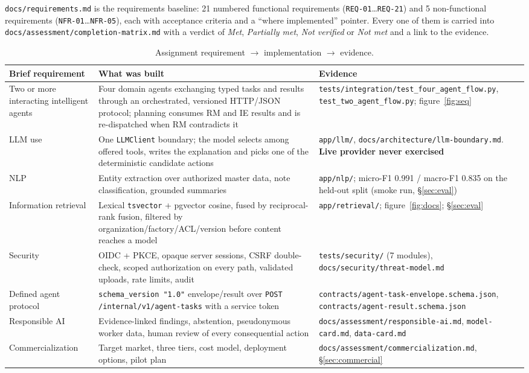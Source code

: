 \documentclass[11pt,a4paper]{article}
\begin{document}
\texttt{docs/requirements.md} is the requirements baseline: 21 numbered
functional requirements (\texttt{REQ-01}\dots\texttt{REQ-21}) and 5
non-functional requirements (\texttt{NFR-01}\dots\texttt{NFR-05}), each with
acceptance criteria and a ``where implemented'' pointer. Every one of them is
carried into \texttt{docs/assessment/completion-matrix.md} with a verdict of
\emph{Met}, \emph{Partially met}, \emph{Not verified} or \emph{Not met} and a
link to the evidence.

\begin{table}[h]
\centering\small
\caption{Assignment requirement $\rightarrow$ implementation $\rightarrow$ evidence.}
\begin{tabularx}{\linewidth}{@{}L{3.1cm}YL{3.6cm}@{}}
\toprule
\textbf{Brief requirement} & \textbf{What was built} & \textbf{Evidence}\\
\midrule
Two or more interacting intelligent agents &
Four domain agents exchanging typed tasks and results through an orchestrated,
versioned HTTP/JSON protocol; planning consumes RM and IE results and is
re-dispatched when RM contradicts it &
\texttt{tests/integration/test\_four\_agent\_flow.py}, \texttt{test\_two\_agent\_flow.py}; figure~\ref{fig:seq}\\
LLM use &
One \texttt{LLMClient} boundary; the model selects among offered tools, writes
the explanation and picks one of the deterministic candidate actions &
\texttt{app/llm/}, \texttt{docs/architecture/llm-boundary.md}. \textbf{Live provider never exercised}\\
NLP &
Entity extraction over authorized master data, note classification, grounded
summaries &
\texttt{app/nlp/}; micro-F1 0.991 / macro-F1 0.835 on the held-out split (smoke run, \S\ref{sec:eval})\\
Information retrieval &
Lexical \texttt{tsvector} + pgvector cosine, fused by reciprocal-rank fusion,
filtered by organization/factory/ACL/version before content reaches a model &
\texttt{app/retrieval/}; figure~\ref{fig:docs}; \S\ref{sec:eval}\\
Security &
OIDC + PKCE, opaque server sessions, CSRF double-check, scoped authorization on
every path, validated uploads, rate limits, audit &
\texttt{tests/security/} (7 modules), \texttt{docs/security/threat-model.md}\\
Defined agent protocol &
\texttt{schema\_version "1.0"} envelope/result over
\texttt{POST /internal/v1/agent-tasks} with a service token &
\texttt{contracts/agent-task-envelope.schema.json}, \texttt{contracts/agent-result.schema.json}\\
Responsible AI &
Evidence-linked findings, abstention, pseudonymous worker data, human review of
every consequential action &
\texttt{docs/assessment/responsible-ai.md}, \texttt{model-card.md}, \texttt{data-card.md}\\
Commercialization &
Target market, three tiers, cost model, deployment options, pilot plan &
\texttt{docs/assessment/commercialization.md}, \S\ref{sec:commercial}\\
\bottomrule
\end{tabularx}
\end{table}
\end{document}

